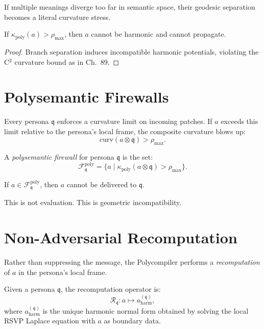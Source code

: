 If multiple meanings diverge too far in semantic space,
their geodesic separation becomes a literal curvature stress.

\begin{theorem}
If $\kappa_{\mathrm{poly}}(a) > \rho_{\max}$,
then $a$ cannot be harmonic and cannot propagate.
\end{theorem}

\begin{proof}
Branch separation induces incompatible harmonic potentials,
violating the C$^2$ curvature bound as in Ch.~89.
\end{proof}

\section{Polysemantic Firewalls}

Every persona $\mathfrak{q}$ enforces a curvature limit on incoming patches.
If $a$ exceeds this limit relative to the persona’s local frame,
the composite curvature blows up:
\[
\mathrm{curv}(a \otimes \mathfrak{q})
> \rho_{\max}.
\]

\begin{definition}
A \emph{polysemantic firewall} for persona $\mathfrak{q}$ is the set:
\[
\mathcal{F}^{\mathrm{poly}}_{\mathfrak{q}}
=
\{
a \mid
\kappa_{\mathrm{poly}}(a \otimes \mathfrak{q})
> \rho_{\max}
\}.
\]
\end{definition}

\begin{invariant}
If $a \in \mathcal{F}^{\mathrm{poly}}_{\mathfrak{q}}$,  
then $a$ cannot be delivered to $\mathfrak{q}$.
\end{invariant}

This is not evaluation.
This is geometric incompatibility.

\section{Non-Adversarial Recomputation}

Rather than suppressing the message,  
the Polycompiler performs a \emph{recomputation} of $a$ in the persona’s local frame.

\begin{definition}
Given a persona $\mathfrak{q}$,
the recomputation operator is:
\[
\mathcal{R}_{\mathfrak{q}}
: a \mapsto a^{(\mathfrak{q})}_{\mathrm{harm}},
\]
where $a^{(\mathfrak{q})}_{\mathrm{harm}}$ is the unique harmonic normal form
obtained by solving the local RSVP Laplace equation with $a$ as boundary data.
\end{definition}

